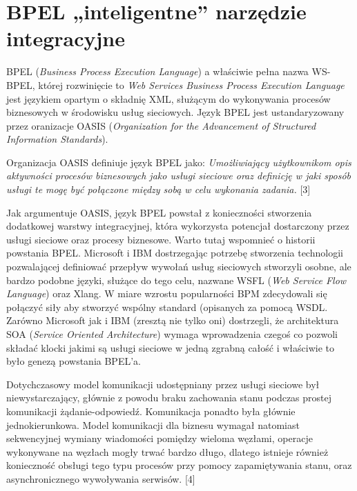 \chapter{BPEL „inteligentne” narzędzie integracyjne}
\label{cha:bpel}

BPEL (\textit{Business Process Execution Language}) a właściwie pełna nazwa WS-BPEL,  której rozwinięcie to \textit{Web Services Business Process Execution Language} jest językiem opartym o składnię XML, służącym do wykonywania procesów biznesowych w środowisku  usług sieciowych. Język BPEL jest ustandaryzowany przez oranizacje OASIS (\textit{Organization for the Advancement of Structured Information Standards}). 

Organizacja OASIS definiuje język BPEL jako: \textit{Umożliwiający użytkownikom opis aktywności procesów biznesowych jako usługi sieciowe oraz definicję w jaki sposób usługi te mogę być połączone między sobą w celu wykonania zadania.} [3]

Jak argumentuje OASIS, język BPEL powstał z konieczności stworzenia dodatkowej warstwy integracyjnej, która wykorzysta potencjał dostarczony przez usługi sieciowe oraz procesy biznesowe. Warto tutaj wspomnieć o historii powstania BPEL. Microsoft i IBM dostrzegając potrzebę stworzenia technologii pozwalającej definiować przepływ wywołań usług sieciowych stworzyli osobne, ale bardzo podobne języki, służące do tego celu, nazwane WSFL (\textit{Web Service Flow Language}) oraz Xlang. W miare wzrostu popularności BPM zdecydowali się połączyć siły aby stworzyć wspólny standard (opisanych za pomocą WSDL. Zarówno Microsoft jak i IBM (zresztą nie tylko oni) dostrzegli, że architektura SOA (\textit{Service Oriented Architecture}) wymaga wprowadzenia czegoś co pozwoli składać klocki jakimi są usługi sieciowe w jedną zgrabną całość i właściwie to było genezą powstania BPEL'a. 

Dotychczasowy model komunikacji udostępniany przez usługi sieciowe był niewystarczający, głównie z powodu braku zachowania stanu podczas prostej komunikacji żądanie-odpowiedź.  Komunikacja ponadto była głównie jednokierunkowa. Model komunikacji dla biznesu wymagał natomiast sekwencyjnej wymiany wiadomości pomiędzy wieloma węzłami, operacje wykonywane na węzłach mogły trwać bardzo długo, dlatego istnieje również konieczność obsługi tego typu procesów przy pomocy zapamiętywania stanu, oraz asynchronicznego wywoływania serwisów. [4]


